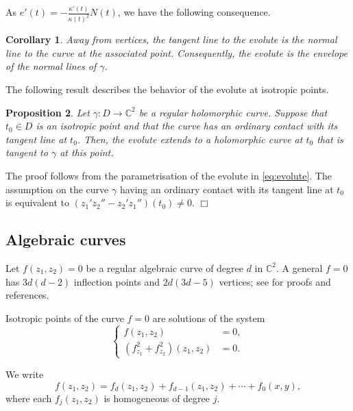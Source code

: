 \documentclass[12pt,a4paper]{article}
\newtheorem{prop}{Proposition}[section]
\newtheorem{cor}[prop]{Corollary}
\newenvironment{proof}
{\begin{trivlist} \item[\hskip \labelsep {\bf Proof}\hspace*{3 mm}]}
	{\hfill$\Box$\end{trivlist}}
\begin{document}
As $e'(t)=-\frac{\kappa'(t)}{\kappa(t)^2}N(t)$, we have the following consequence.

\begin{cor}\label{cor:envelopNormals}
Away from vertices, the tangent line to the evolute is the normal line to the curve at the associated point.
Consequently, the evolute is the envelope of the normal lines of $\gamma$.
\end{cor}


The following result describes the behavior of the evolute at isotropic points.

\begin{prop}
Let $\gamma: D \rightarrow \mathbb{C}^{2}$ be a regular holomorphic curve. Suppose that $t_{0}\in D$ is an isotropic point and that the curve has an ordinary contact with its tangent line at $t_0$. Then, the evolute extends to a holomorphic curve at $t_0$ that is tangent to $\gamma$ at this point.
\end{prop}

\begin{proof}
The proof follows from the parametrisation of the evolute in \eqref{eq:evolute}. The assumption on the curve $\gamma$ having an ordinary contact with its tangent line at $t_0$ is equivalent to $(z_1'z_2''-z_2'z_1'')(t_0)\ne 0.$
\end{proof}



\subsection{Algebraic curves}
Let $f(z_1,z_2)=0$ 
be a regular algebraic curve of degree $d$  in $\mathbb{C}^2$. 
A general $f=0$ has $3d(d-2)$ inflection points and  $2d(3d-5)$ vertices; 
see \cite[Chapter 6]{MetrixAlgGeom} for proofs and references. 

Isotropic points of the curve $f=0$ are solutions of the system
\begin{equation}\label{sys:NrIP}
 \left\{
\begin{aligned}
f(z_1,z_2)&=0,\\
(f_{z_{1}}^{2} + f_{z_{2}}^{2})(z_{1},z_{2})&=0.
\end{aligned}
\right.
\end{equation}

We write 
$$
f(z_1,z_2)=f_d(z_1,z_2) + f_{d-1}(z_1,z_2) + \cdots + f_{0}(x,y),
$$
where each $f_j(z_1,z_2)$ is homogeneous of degree $j$.
\end{document}
